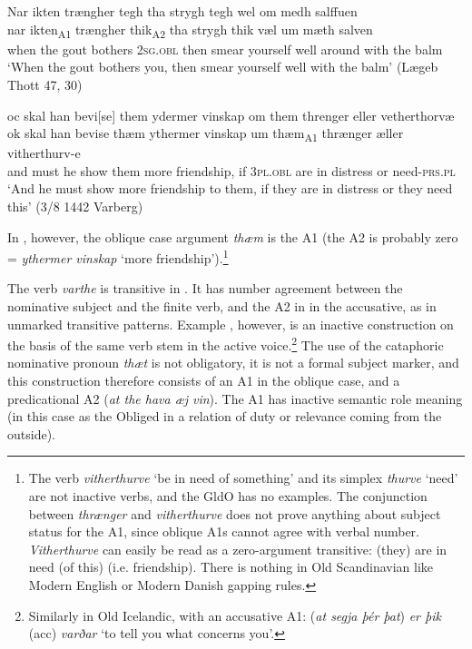 \documentclass[output=paper]{langscibook}
\begin{document}
\ex \label{ex:heltoft:17b}
    \glll Nar ikten trængher tegh tha strygh tegh wel om medh salffuen   \\        
        nar    ikten\textsubscript{A1}  trængher  thik\textsubscript{A2}   tha strygh thik væl um mæth salven\\
         when   {the gout} bothers    \textsc{2sg.obl}   then smear yourself well around with {the balm}\\
    \glt `When the gout bothers you, then smear yourself well with the balm' (Lægeb Thott 47, 30)

\ex \label{ex:heltoft:17c}
    \glll oc skal han bevi[se] them ydermer vinskap om them   threnger eller vetherthorvæ\\
         ok skal han bevise thæm ythermer vinskap   um    thæm\textsubscript{A1}  thrænger æller   vitherthurv-e\\
         and must he show them more friendship,   if     3\textsc{pl.obl}   {are in distress} or      need-\textsc{prs.pl}\\
    \glt `And he must show more friendship to them, if they are in distress or they need this' (3/8 1442 Varberg)
\z\z

In , however, the oblique case argument \textit{thæm} is the A1 (the A2 is probably zero = \textit{ythermer vinskap} ‘more friendship').\footnote{The verb \textit{vitherthurve} ‘be in need of something' and its simplex \textit{thurve} ‘need' are not inactive verbs, and the GldO has no examples. The conjunction between \textit{thrænger} and \textit{vitherthurve} does not prove anything about subject status for the A1, since oblique A1s cannot agree with verbal number. \textit{Vitherthurve} can easily be read as a zero-argument transitive: (they) are in need (of this) (i.e. friendship). There is nothing in Old Scandinavian like Modern English or Modern Danish gapping rules.}

The verb \textit{varthe} is transitive in . It has number agreement between the nominative subject and the finite verb, and the A2 in in the accusative, as in unmarked transitive patterns. Example , however, is an inactive construction on the basis of the same verb stem in the active voice.\footnote{Similarly in Old Icelandic, with an accusative A1: (\textit{at segja þ}\textit{ér þat}) \textit{er þik} (acc) \textit{varðar} ‘to tell you what concerns you'.} The use of the cataphoric nominative pronoun \textit{thæt} is not obligatory, it is not a formal subject marker, and this construction therefore consists of an A1 in the oblique case, and a predicational A2 (\textit{at the hava æj vin}). The A1 has inactive semantic role meaning (in this case as the Obliged in a relation of duty or relevance coming from the outside).
\end{document}
